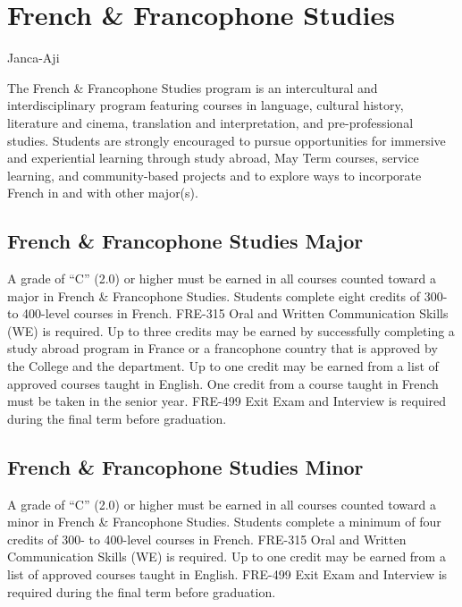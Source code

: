 \documentclass[
  letterpaper,
]{scrbook}
\begin{document}
\section{French \& Francophone
Studies}\label{sec-french-and-francophone-studies}

Janca-Aji

The French \& Francophone Studies program is an intercultural and
interdisciplinary program featuring courses in language, cultural
history, literature and cinema, translation and interpretation, and
pre-professional studies. Students are strongly encouraged to pursue
opportunities for immersive and experiential learning through study
abroad, May Term courses, service learning, and community-based projects
and to explore ways to incorporate French in and with other major(s).

\subsection{French \& Francophone Studies
Major}\label{french-francophone-studies-major}

A grade of ``C'' (2.0) or higher must be earned in all courses counted
toward a major in French \& Francophone Studies. Students complete eight
credits of 300- to 400-level courses in French. FRE-315 Oral and Written
Communication Skills (WE) is required. Up to three credits may be earned
by successfully completing a study abroad program in France or a
francophone country that is approved by the College and the department.
Up to one credit may be earned from a list of approved courses taught in
English. One credit from a course taught in French must be taken in the
senior year. FRE-499 Exit Exam and Interview is required during the
final term before graduation.

\subsection{French \& Francophone Studies
Minor}\label{french-francophone-studies-minor}

A grade of ``C'' (2.0) or higher must be earned in all courses counted
toward a minor in French \& Francophone Studies. Students complete a
minimum of four credits of 300- to 400-level courses in French. FRE-315
Oral and Written Communication Skills (WE) is required. Up to one credit
may be earned from a list of approved courses taught in English. FRE-499
Exit Exam and Interview is required during the final term before
graduation.
\end{document}
